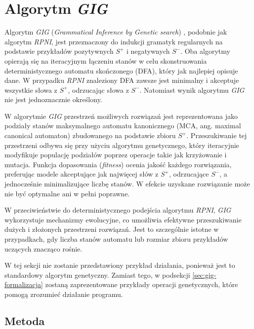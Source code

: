 \section{Algorytm \textit{GIG}}
\label{sec:gig}

Algorytm \textit{GIG} (\textit{Grammatical Inference by Genetic search}) \cite{GIG}, podobnie jak algorytm \textit{RPNI}, jest przeznaczony do indukcji gramatyk regularnych na podstawie przykładów pozytywnych \( S^+ \) i negatywnych \( S^- \). Oba algorytmy opierają się na iteracyjnym łączeniu stanów w celu skonstruowania deterministycznego automatu skończonego (DFA), który jak najlepiej opisuje dane. W przypadku \textit{RPNI} znaleziony DFA zawsze jest minimalny i akceptuje wszystkie słowa z \( S^+ \), odrzucając słowa z \( S^- \). Natomiast wynik algorytmu \textit{GIG} nie jest jednoznacznie określony.

W algorytmie \textit{GIG} przestrzeń możliwych rozwiązań jest reprezentowana jako podziały stanów maksymalnego automatu kanonicznego (MCA, ang. maximal canonical automaton) zbudowanego na podstawie zbioru \( S^+ \). Przeszukiwanie tej przestrzeni odbywa się przy użyciu algorytmu genetycznego, który iteracyjnie modyfikuje populację podziałów poprzez operacje takie jak krzyżowanie i mutacja. Funkcja dopasowania (\textit{fitness}) ocenia jakość każdego rozwiązania, preferując modele akceptujące jak najwięcej słów z \( S^+ \), odrzucające \( S^- \), a jednocześnie minimalizujące liczbę stanów. W efekcie uzyskane rozwiązanie może nie być optymalne ani w pełni poprawne.

W przeciwieństwie do deterministycznego podejścia algorytmu \textit{RPNI}, \textit{GIG} wykorzystuje mechanizmy ewolucyjne, co umożliwia efektywne przeszukiwanie dużych i złożonych przestrzeni rozwiązań. Jest to szczególnie istotne w przypadkach, gdy liczba stanów automatu lub rozmiar zbioru przykładów uczących znacząco rośnie.

W tej sekcji nie zostanie przedstawiony przykład działania, ponieważ jest to standardowy algorytm genetyczny. Zamiast tego, w podsekcji \ref{sec:gig-formalizacja} zostaną zaprezentowane przykłady operacji genetycznych, które pomogą zrozumieć działanie programu.

\subsection{Metoda}

